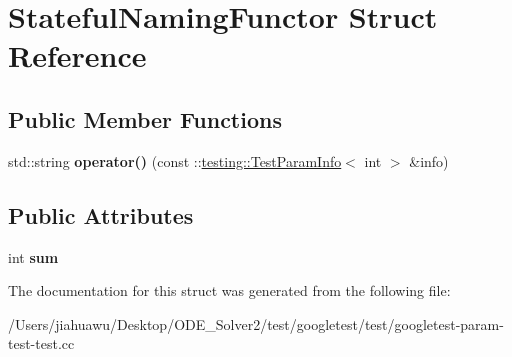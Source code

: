 \hypertarget{struct_stateful_naming_functor}{}\section{Stateful\+Naming\+Functor Struct Reference}
\label{struct_stateful_naming_functor}
\subsection*{Public Member Functions}
\begin{DoxyCompactItemize}
\item 
\mbox{\label{struct_stateful_naming_functor_a6a1d07c0b8314c1aee535f269ea536db}} 
std\+::string {\bfseries operator()} (const \+::\mbox{\hyperlink{structtesting_1_1_test_param_info}{testing\+::\+Test\+Param\+Info}}$<$ int $>$ \&info)
\end{DoxyCompactItemize}
\subsection*{Public Attributes}
\begin{DoxyCompactItemize}
\item 
\mbox{\label{struct_stateful_naming_functor_a95887cf031d3113ae2edcd7617af3b79}} 
int {\bfseries sum}
\end{DoxyCompactItemize}


The documentation for this struct was generated from the following file\+:\begin{DoxyCompactItemize}
\item 
/\+Users/jiahuawu/\+Desktop/\+O\+D\+E\+\_\+\+Solver2/test/googletest/test/googletest-\/param-\/test-\/test.\+cc\end{DoxyCompactItemize}
